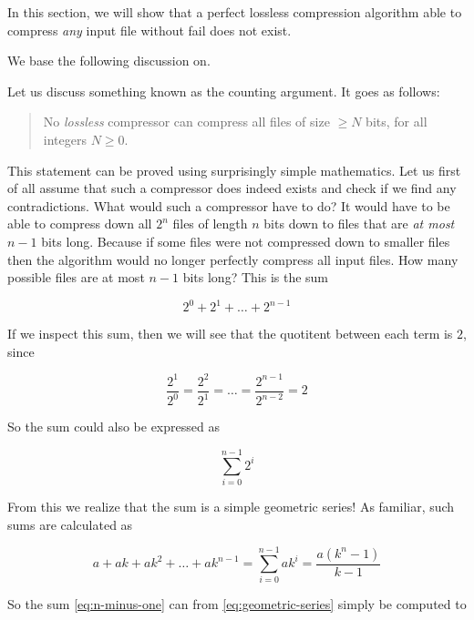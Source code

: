 In this section, we will show that a perfect lossless compression
algorithm able to compress \textit{any} input file without fail does
not exist.

We base the following discussion on\cite{Salomon:2004:DCC,jean-loup-comp-faq}.

Let us discuss something known as the counting argument. It goes as
follows:

\begin{quote}
  No \textit{lossless} compressor can compress all files of size $\ge
  N$ bits, for all integers $N \ge 0$.
\end{quote}

This statement can be proved using surprisingly simple
mathematics. Let us first of all assume that such a compressor does
indeed exists and check if we find any contradictions. What would such
a compressor have to do? It would have to be able to compress down all
$2^n$ files of length $n$ bits down to files that are \textit{at most}
$n-1$ bits long. Because if some files were not compressed down to
smaller files then the algorithm would no longer perfectly compress all
input files. How many possible files are at most $n-1$ bits long?
This is the sum

\begin{equation}
  \label{eq:n-minus-one}
  2^0 + 2^1 + \dots + 2^{n-1}
\end{equation}

If we inspect this sum, then we will see that the quotitent between
each term is $2$, since

\begin{equation*}
  \frac{2^1}{2^0} = \frac{2^2}{2^1} = \dots = \frac{2^{n-1}}{2^{n-2}} = 2
\end{equation*}

So the sum could also be expressed as

\begin{equation*}
  \sum^{n-1}_{i = 0} 2^{i}
\end{equation*}

From this we realize that the sum is a simple geometric series! As
familiar, such sums are calculated as

\begin{equation}
  \label{eq:geometric-series}
  a + ak + ak^2 + \dots + ak^{n-1} = \sum^{n-1}_{i = 0} ak^{i} =
  \frac{a(k^n - 1)}{k -1}
\end{equation}

So the sum \eqref{eq:n-minus-one} can from \eqref{eq:geometric-series}
simply be computed to

